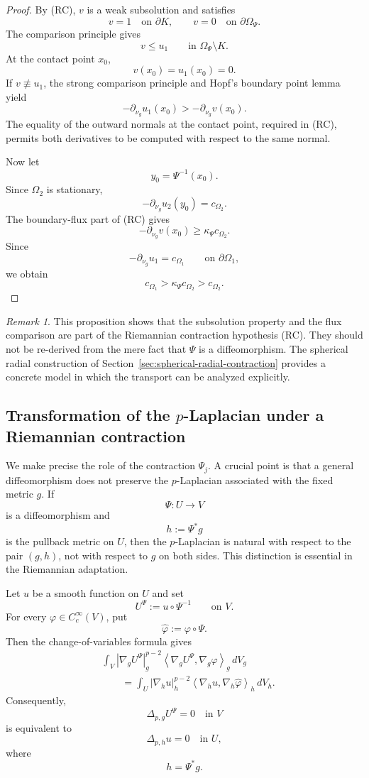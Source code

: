 \documentclass[11pt,a4paper]{article}
\theoremstyle{definition}
\theoremstyle{remark}
\newtheorem{remark}[theorem]{Remark}
\begin{document}
\begin{proof}
By {\rm (RC)}, $v$ is a weak subsolution and satisfies
\[
v=1\quad\text{on }\partial K,
\qquad
v=0\quad\text{on }\partial\Omega_\Psi.
\]
The comparison principle gives
\[
v\leq u_1
\qquad\text{in }\Omega_\Psi\setminus K.
\]
At the contact point $x_0$,
\[
v(x_0)=u_1(x_0)=0.
\]
If $v\not\equiv u_1$, the strong comparison principle and Hopf's
boundary point lemma yield
\[
-\partial_{\nu_g}u_1(x_0)
>
-\partial_{\nu_g}v(x_0).
\]
The equality of the outward normals at the contact point, required in
{\rm (RC)}, permits both derivatives to be computed with respect to the
same normal.

Now let
\[
y_0=\Psi^{-1}(x_0).
\]
Since $\Omega_2$ is stationary,
\[
-\partial_{\nu_g}u_2(y_0)=c_{\Omega_2}.
\]
The boundary-flux part of {\rm (RC)} gives
\[
-\partial_{\nu_g}v(x_0)
\geq
\kappa_\Psi c_{\Omega_2}.
\]
Since
\[
-\partial_{\nu_g}u_1=c_{\Omega_1}
\qquad\text{on }\partial\Omega_1,
\]
we obtain
\[
c_{\Omega_1}>\kappa_\Psi c_{\Omega_2}>c_{\Omega_2}.
\]
\end{proof}

\begin{remark}
This proposition shows that the subsolution property and the flux
comparison are part of the Riemannian contraction hypothesis {\rm (RC)}.
They should not be re-derived from the mere fact that $\Psi$ is a
diffeomorphism. The spherical radial construction of
Section~\ref{sec:spherical-radial-contraction} provides a concrete model
in which the transport can be analyzed explicitly.
\end{remark}

\subsection{Transformation of the $p$-Laplacian under a Riemannian contraction}
\label{sec:transformation-p-laplacian}

We make precise the role of the contraction $\Psi_j$. A crucial
point is that a general diffeomorphism does not preserve the
$p$-Laplacian associated with the fixed metric $g$. If
\[
\Psi:U\longrightarrow V
\]
is a diffeomorphism and
\[
h:=\Psi^\ast g
\]
is the pullback metric on $U$, then the $p$-Laplacian is natural with
respect to the pair $(g,h)$, not with respect to $g$ on both sides.
This distinction is essential in the Riemannian adaptation.

Let $u$ be a smooth function on $U$ and set
\[
U^\Psi:=u\circ\Psi^{-1}
\qquad\text{on }V.
\]
For every $\varphi\in C_c^\infty(V)$, put
\[
\widehat\varphi:=\varphi\circ\Psi.
\]
Then the change-of-variables formula gives
\begin{align}
&\int_V
|\nabla_g U^\Psi|_g^{p-2}
\left\langle
\nabla_g U^\Psi,\nabla_g\varphi
\right\rangle_g\,dV_g
\nonumber\\
&\qquad=
\int_U
|\nabla_h u|_h^{p-2}
\left\langle
\nabla_h u,\nabla_h\widehat\varphi
\right\rangle_h\,dV_h.
\label{eq:pullback-p-laplace-weak}
\end{align}
Consequently,
\[
\Delta_{p,g}U^\Psi
=
0\quad\text{in }V
\]
is equivalent to
\[
\Delta_{p,h}u
=
0\quad\text{in }U,
\]
where
\[
h=\Psi^\ast g.
\]
\end{document}
